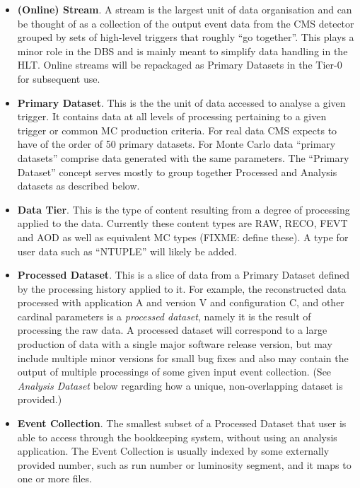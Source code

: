 \documentclass{cmspaper}
\begin{document}
\begin{itemize}
\item {\bf (Online) Stream}. A stream is the largest unit of data organisation
and can be thought of as a collection of the output event data from the CMS
detector grouped by sets of high-level triggers that roughly ``go together''.
This plays a minor role in the DBS and is mainly meant to simplify data 
handling in the HLT. Online streams will be repackaged as Primary Datasets 
in the Tier-0 for subsequent use.

\item {\bf Primary Dataset}. This is the the unit of 
data accessed to analyse a given trigger.  It contains data at all levels of 
processing pertaining to a given trigger or common MC production criteria.
For real data CMS expects to have of the order of 50 primary datasets.  
For Monte Carlo data ``primary datasets'' comprise data generated with the 
same parameters. The ``Primary Dataset'' concept serves mostly to group 
together Processed and Analysis datasets as described below.

\item {\bf Data Tier}. This is the type of content resulting from a 
degree of processing applied to the data. Currently these content types
are RAW, RECO, FEVT and AOD as well as equivalent MC types (FIXME: define 
these). A type for user data such as ``NTUPLE'' will likely be added. 

\item {\bf Processed Dataset}. This is a slice of data from a Primary Dataset
defined by the processing history applied to it.  For example, the 
reconstructed data processed with application A and version V and 
configuration C, and other cardinal parameters is a {\em processed dataset}, 
namely it is the result of processing the raw data. A processed dataset
will correspond to a large production of data with a single major software
release version, but may include multiple minor versions for small bug
fixes and also may contain the output of multiple processings of some 
given input event collection. (See {\em Analysis Dataset} below regarding
how a unique, non-overlapping dataset is provided.)

\item{\bf Event Collection}. The smallest subset of a Processed Dataset that
user is able to access through the bookkeeping system, without using an
analysis application.  The Event Collection is usually indexed by some 
externally provided number, such as run number or luminosity segment, and 
it maps to one or more files.  


\end{itemize}
\end{document}
